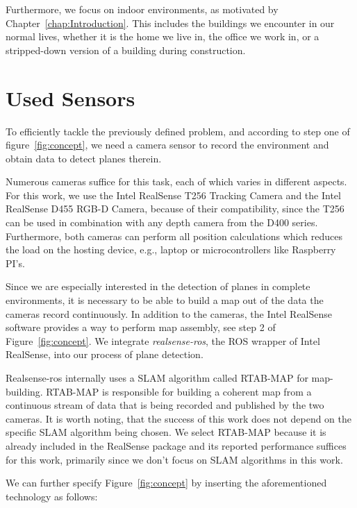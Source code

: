 \documentclass[main.tex]{subfiles}
\begin{document}
Furthermore, we focus on indoor environments, as motivated by Chapter~\ref{chap:Introduction}.
This includes the buildings we encounter in our normal lives, whether it is the home we live in, the office we work in, or a stripped-down version of a building during construction.




\section{Used Sensors}
To efficiently tackle the previously defined problem, and according to step one of figure~\ref{fig:concept}, we need a camera sensor to record the environment and obtain data to detect planes therein.

Numerous cameras suffice for this task, each of which varies in different aspects.
For this work, we use the Intel RealSense T256 Tracking Camera and the Intel RealSense D455 RGB-D Camera, because of their compatibility,
since the T256 can be used in combination with any depth camera from the D400 series. Furthermore, both cameras can perform all position calculations which
reduces the load on the hosting device, e.g., laptop or microcontrollers like Raspberry PI's.

Since we are especially interested in the detection of planes in complete environments, it is necessary to be able to build a map out of the data the cameras
record continuously.
In addition to the cameras, the Intel RealSense software provides a way to perform map assembly, see step 2 of Figure~\ref{fig:concept}.%
We integrate \textit{realsense-ros}, the ROS wrapper of Intel RealSense, into our process of plane detection.

Realsense-ros internally uses a SLAM algorithm called RTAB-MAP \cite{Labbé_Michaud_2019} for map-building.
RTAB-MAP is responsible for building a coherent map from a continuous stream of data that is being recorded and published by the two cameras.
It is worth noting, that the success of this work does not depend on the specific SLAM algorithm being chosen. We select RTAB-MAP because
it is already included in the RealSense package and its reported performance suffices for this work, primarily since we don't focus on SLAM
algorithms in this work.

We can further specify Figure~\ref{fig:concept} by inserting the aforementioned technology as follows:
\end{document}
